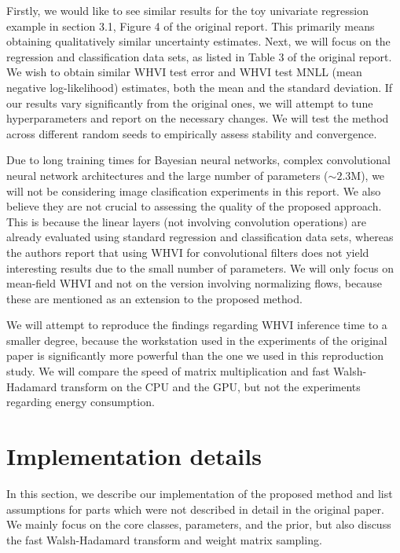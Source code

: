 \documentclass[11pt, twocolumn]{article}
\begin{document}
    Firstly, we would like to see similar results for the toy univariate regression example in section 3.1, Figure 4 of the original report.
    This primarily means obtaining qualitatively similar uncertainty estimates.
    Next, we will focus on the regression and classification data sets, as listed in Table 3 of the original report.
    We wish to obtain similar WHVI test error and WHVI test MNLL (mean negative log-likelihood) estimates, both the mean and the standard deviation.
    If our results vary significantly from the original ones, we will attempt to tune hyperparameters and report on the necessary changes.
    We will test the method across different random seeds to empirically assess stability and convergence.

    Due to long training times for Bayesian neural networks, complex convolutional neural network architectures and the large number of parameters ($\sim 2.3$M), we will not be considering image clasification experiments in this report.
    We also believe they are not crucial to assessing the quality of the proposed approach.
    This is because the linear layers (not involving convolution operations) are already evaluated using standard regression and classification data sets, whereas the authors report that using WHVI for convolutional filters does not yield interesting results due to the small number of parameters.
    We will only focus on mean-field WHVI and not on the version involving normalizing flows, because these are mentioned as an extension to the proposed method.

    We will attempt to reproduce the findings regarding WHVI inference time to a smaller degree, because the workstation used in the experiments of the original paper is significantly more powerful than the one we used in this reproduction study.
    We will compare the speed of matrix multiplication and fast Walsh-Hadamard transform on the CPU and the GPU, but not the experiments regarding energy consumption.

    \section{Implementation details}\label{sec:implementation-details}
    In this section, we describe our implementation of the proposed method and list assumptions for parts which were not described in detail in the original paper.
    We mainly focus on the core classes, parameters, and the prior, but also discuss the fast Walsh-Hadamard transform and weight matrix sampling.
\end{document}
